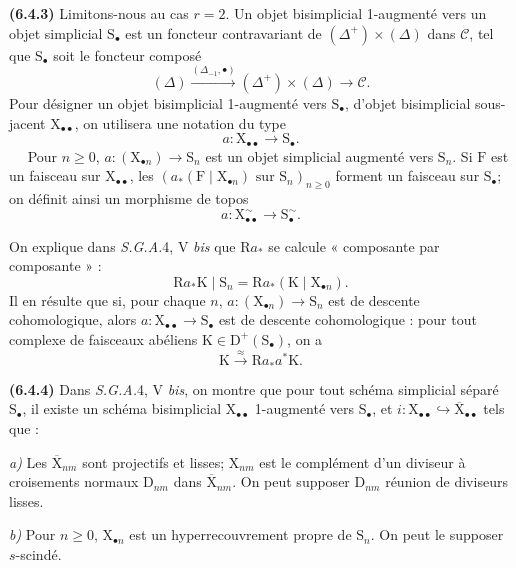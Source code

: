 \documentclass[11pt,leqno]{article}
\newcommand{\Page}[1]{\ifvmode\noindent\else\unskip\ \fi{\footnotesize\textcolor{gray}{[p.\,#1]}}\ \ignorespaces}
\begin{document}
\textbf{(6.4.3)} Limitons-nous au cas \(r=2\). Un objet bisimplicial 1-augmenté vers un objet simplicial \(\mathrm{S}_{\bullet}\) est un foncteur contravariant de \((\Delta^{+})\times(\Delta)\) dans \(\mathscr{C}\), tel que \(\mathrm{S}_{\bullet}\) soit le foncteur composé
\[
(\Delta)\xrightarrow{(\Delta_{-1},\bullet)}
(\Delta^{+})\times(\Delta)\longrightarrow\mathscr{C}.
\]
Pour désigner un objet bisimplicial 1-augmenté vers \(\mathrm{S}_{\bullet}\), d’objet bisimplicial sous-jacent \(\mathrm{X}_{\bullet\bullet}\), on utilisera une notation du type
\[
a:\mathrm{X}_{\bullet\bullet}\to\mathrm{S}_{\bullet}.
\]
\Page{23}
Pour \(n\geq 0\), \(a:(\mathrm{X}_{\bullet n})\to\mathrm{S}_n\) est un objet simplicial augmenté vers \(\mathrm{S}_n\). Si \(\mathrm{F}\) est un faisceau sur \(\mathrm{X}_{\bullet\bullet}\), les \((a_{\ast}(\mathrm{F}\mid\mathrm{X}_{\bullet n})\text{ sur }\mathrm{S}_n)_{n\geq 0}\) forment un faisceau sur \(\mathrm{S}_{\bullet}\); on définit ainsi un morphisme de topos
\[
a:\mathrm{X}_{\bullet\bullet}^{\sim}\to\mathrm{S}_{\bullet}^{\sim}.
\]

On explique dans \textit{S.G.A.}4, V \textit{bis} que \(\mathrm{R}a_{\ast}\) se calcule « composante par composante » :
\[
\mathrm{R}a_{\ast}\mathrm{K}\mid\mathrm{S}_n
=\mathrm{R}a_{\ast}(\mathrm{K}\mid\mathrm{X}_{\bullet n}).
\]
Il en résulte que si, pour chaque \(n\), \(a:(\mathrm{X}_{\bullet n})\to\mathrm{S}_n\) est de descente cohomologique, alors \(a:\mathrm{X}_{\bullet\bullet}\to\mathrm{S}_{\bullet}\) est de descente cohomologique : pour tout complexe de faisceaux abéliens \(\mathrm{K}\in\mathrm{D}^{+}(\mathrm{S}_{\bullet})\), on a
\[
\mathrm{K}\xrightarrow{\approx}\mathrm{R}a_{\ast}a^{\ast}\mathrm{K}.
\]

\textbf{(6.4.4)} Dans \textit{S.G.A.}4, V \textit{bis}, on montre que pour tout schéma simplicial séparé \(\mathrm{S}_{\bullet}\), il existe un schéma bisimplicial \(\mathrm{X}_{\bullet\bullet}\) 1-augmenté vers \(\mathrm{S}_{\bullet}\), et \(i:\mathrm{X}_{\bullet\bullet}\hookrightarrow\overline{\mathrm{X}}_{\bullet\bullet}\) tels que :

\textit{a)} Les \(\overline{\mathrm{X}}_{nm}\) sont projectifs et lisses; \(\mathrm{X}_{nm}\) est le complément d’un diviseur à croisements normaux \(\mathrm{D}_{nm}\) dans \(\overline{\mathrm{X}}_{nm}\). On peut supposer \(\mathrm{D}_{nm}\) réunion de diviseurs lisses.

\textit{b)} Pour \(n\geq 0\), \(\mathrm{X}_{\bullet n}\) est un hyperrecouvrement propre de \(\mathrm{S}_n\). On peut le supposer \(s\)-scindé.
\end{document}
